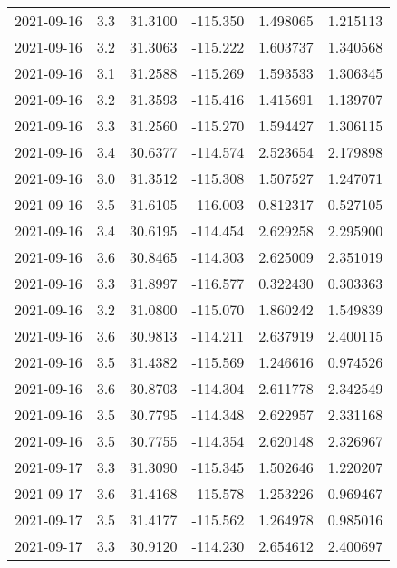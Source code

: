 \begin{tabular}{lrrrrr}
2021-09-16 &       3.3 &  31.3100 &  -115.350 &         1.498065 &         1.215113 \\
2021-09-16 &       3.2 &  31.3063 &  -115.222 &         1.603737 &         1.340568 \\
2021-09-16 &       3.1 &  31.2588 &  -115.269 &         1.593533 &         1.306345 \\
2021-09-16 &       3.2 &  31.3593 &  -115.416 &         1.415691 &         1.139707 \\
2021-09-16 &       3.3 &  31.2560 &  -115.270 &         1.594427 &         1.306115 \\
2021-09-16 &       3.4 &  30.6377 &  -114.574 &         2.523654 &         2.179898 \\
2021-09-16 &       3.0 &  31.3512 &  -115.308 &         1.507527 &         1.247071 \\
2021-09-16 &       3.5 &  31.6105 &  -116.003 &         0.812317 &         0.527105 \\
2021-09-16 &       3.4 &  30.6195 &  -114.454 &         2.629258 &         2.295900 \\
2021-09-16 &       3.6 &  30.8465 &  -114.303 &         2.625009 &         2.351019 \\
2021-09-16 &       3.3 &  31.8997 &  -116.577 &         0.322430 &         0.303363 \\
2021-09-16 &       3.2 &  31.0800 &  -115.070 &         1.860242 &         1.549839 \\
2021-09-16 &       3.6 &  30.9813 &  -114.211 &         2.637919 &         2.400115 \\
2021-09-16 &       3.5 &  31.4382 &  -115.569 &         1.246616 &         0.974526 \\
2021-09-16 &       3.6 &  30.8703 &  -114.304 &         2.611778 &         2.342549 \\
2021-09-16 &       3.5 &  30.7795 &  -114.348 &         2.622957 &         2.331168 \\
2021-09-16 &       3.5 &  30.7755 &  -114.354 &         2.620148 &         2.326967 \\
2021-09-17 &       3.3 &  31.3090 &  -115.345 &         1.502646 &         1.220207 \\
2021-09-17 &       3.6 &  31.4168 &  -115.578 &         1.253226 &         0.969467 \\
2021-09-17 &       3.5 &  31.4177 &  -115.562 &         1.264978 &         0.985016 \\
2021-09-17 &       3.3 &  30.9120 &  -114.230 &         2.654612 &         2.400697 \\

\end{tabular}

